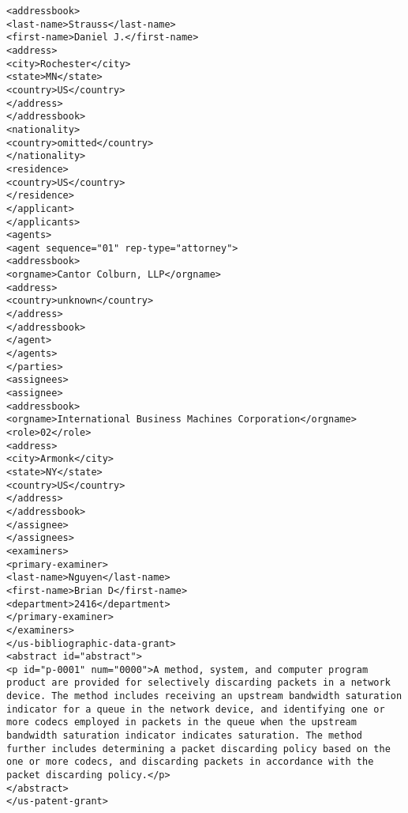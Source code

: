 \begin{lstlisting}
<addressbook>
<last-name>Strauss</last-name>
<first-name>Daniel J.</first-name>
<address>
<city>Rochester</city>
<state>MN</state>
<country>US</country>
</address>
</addressbook>
<nationality>
<country>omitted</country>
</nationality>
<residence>
<country>US</country>
</residence>
</applicant>
</applicants>
<agents>
<agent sequence="01" rep-type="attorney">
<addressbook>
<orgname>Cantor Colburn, LLP</orgname>
<address>
<country>unknown</country>
</address>
</addressbook>
</agent>
</agents>
</parties>
<assignees>
<assignee>
<addressbook>
<orgname>International Business Machines Corporation</orgname>
<role>02</role>
<address>
<city>Armonk</city>
<state>NY</state>
<country>US</country>
</address>
</addressbook>
</assignee>
</assignees>
<examiners>
<primary-examiner>
<last-name>Nguyen</last-name>
<first-name>Brian D</first-name>
<department>2416</department>
</primary-examiner>
</examiners>
</us-bibliographic-data-grant>
<abstract id="abstract">
<p id="p-0001" num="0000">A method, system, and computer program product are provided for selectively discarding packets in a network device. The method includes receiving an upstream bandwidth saturation indicator for a queue in the network device, and identifying one or more codecs employed in packets in the queue when the upstream bandwidth saturation indicator indicates saturation. The method further includes determining a packet discarding policy based on the one or more codecs, and discarding packets in accordance with the packet discarding policy.</p>
</abstract>
</us-patent-grant>
\end{lstlisting}